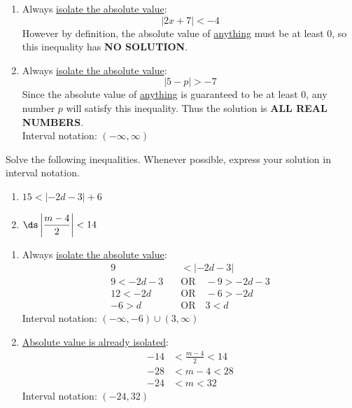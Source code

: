 \documentclass{ximera}
\begin{document}
\begin{problem}
\begin{solution}
\begin{enumerate}
  \item[(d)] Always \underline{isolate the absolute value}: $$|2x+7| < -4$$
  However by definition, the absolute value of \underline{anything} must be at least 0, so this inequality has \textbf{NO SOLUTION}.

  \item[(e)] Always \underline{isolate the absolute value}: $$|5-p| > -7$$
  Since the absolute value of \underline{anything} is guaranteed to be at least 0, any number $p$ will satisfy this inequality. Thus the solution is \textbf{ALL REAL NUMBERS}.\\
  Interval notation: $(-\infty,\infty)$
\end{enumerate}
\end{solution}
\end{problem}


\begin{problem}
Solve the following inequalities. Whenever possible, express your solution in interval notation.
\begin{enumerate}
  \item[(a)] $15 < |-2d-3| + 6$
  \medskip
  \item[(b)] $\ds\left|\dfrac{m-4}{2}\right| < 14$
\end{enumerate}

\begin{solution}
\begin{enumerate}
  \item[(a)] Always \underline{isolate the absolute value}:
  \begin{align*}
    9 &< |-2d-3|\\
    9 < -2d-3 \quad &\text{OR}\quad -9 > -2d-3\\
    12 < -2d \quad &\text{OR}\quad -6 > -2d\\
    -6 > d \quad &\text{OR}\quad 3 < d
  \end{align*}
  Interval notation: $(-\infty,-6) \cup (3,\infty)$

  \item[(b)] \underline{Absolute value is already isolated}:
  \begin{align*}
    -14 &< \frac{m-4}{2} < 14\\
    -28 &< m-4 < 28\\
    -24 &< m < 32
  \end{align*}
  Interval notation: $(-24,32)$
\end{enumerate}
\end{solution}
\end{problem}
\end{document}

